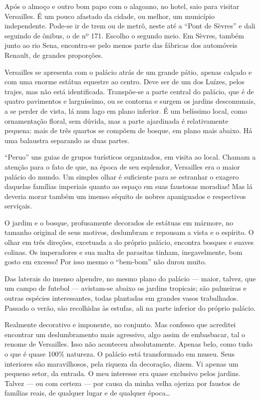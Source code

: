Após o almoço e outro bom papo com o alagoano, no hotel, saio para visitar Versailles. É um pouco afastado da cidade, ou melhor, um município independente. Pode-se ir de trem ou de metrô, neste até a ``Pont de Sèvres'' e dali seguindo de ônibus, o de nº 171. Escolho o segundo meio. Em Sèvres, também junto ao rio Sena, encontra-se pelo menos parte das fábricas dos automóveis Renault, de grandes proporções.

Versailles se apresenta com o palácio atrás de um grande pátio, apenas calçado e com uma enorme estátua equestre ao centro. Deve ser de um dos Luízes, pelos trajes, mas não está identificada. Transpõe-se a parte central do palácio, que é de quatro pavimentos e larguíssimo, ou se contorna e surgem os jardins descomunais, a se perder de vista, lá num lago em plano inferior. É um belíssimo local, como ornamentação floral, sem dúvida, mas a parte ajardinada é relativamente pequena: mais de três quartos se compõem de bosque, em plano mais abaixo. Há uma balaustra separando as duas partes.

``Peruo'' uns guias de grupos turísticos organizados, em visita ao local. Chamam a atenção para o fato de que, na época de seu esplendor, Versailles era o maior palácio do mundo. Um simples olhar é suficiente para se estranhar o exagero daquelas famílias imperiais quanto ao espaço em suas faustosas moradias! Mas lá deveria morar também um imenso séquito de nobres apaniguados e respectivos serviçais.

O jardim e o bosque, profusamente decorados de estátuas em mármore, no tamanho original de seus motivos, deslumbram e repousam a vista e o espírito. O olhar em três direções, excetuada a do próprio palácio, encontra bosques e suaves colinas. Os imperadores e sua malta de parasitas tinham, inegavelmente, bom gosto em excesso! Por isso mesmo o ``bem-bom'' não durou muito.

Das laterais do imenso alpendre, no mesmo plano do palácio --- maior, talvez, que um campo de futebol --- avistam-se abaixo os jardins tropicais; são palmeiras e outras espécies interessantes, todas plantadas em grandes vasos trabalhados. Passado o verão, são recolhidas às estufas, ali na parte inferior do próprio palácio.

Realmente decorativo e imponente, no conjunto. Mas confesso que acreditei encontrar um deslumbramento mais agressivo, algo assim de embasbacar, tal o renome de Versailles. Isso não aconteceu absolutamente. Apenas belo, como tudo o que é quase 100\% natureza. O palácio está transformado em museu. Seus interiores são maravilhosos, pela riqueza da decoração, dizem. Vi apenas um pequeno setor, da entrada. O meu interesse era quase exclusivo pelos jardins. Talvez --- ou com certeza --- por causa da minha velha ojeriza por faustos de famílias reais, de qualquer lugar e de qualquer época\ldots


